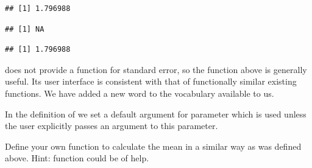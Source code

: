 \documentclass[krantz2]{krantz}\usepackage{knitr}
\begin{document}
\begin{knitrout}\footnotesize
{}\color{fgcolor}\begin{kframe}
\begin{alltt}
\hlstd{(} 
\end{alltt}
\begin{verbatim}
## [1] 1.796988
\end{verbatim}
\begin{alltt}
\hlstd{(} 
\end{alltt}
\begin{verbatim}
## [1] NA
\end{verbatim}
\begin{alltt}
\hlstd{(}   \hlstd{=} \hlstd{)}
\end{alltt}
\begin{verbatim}
## [1] 1.796988
\end{verbatim}
\end{kframe}
\end{knitrout}

\Rlang does not provide a function for standard error, so the function above is generally useful. Its user interface is consistent with that of functionally similar existing functions. We have added a new word to the \Rlang vocabulary available to us.

In the definition of  we set a default argument for parameter  which is used unless the user explicitly passes an argument to this parameter.



\begin{playground}
Define your own function to calculate the mean in a similar way as  was defined above. Hint: function  could be of help.
\end{playground}
\end{document}
